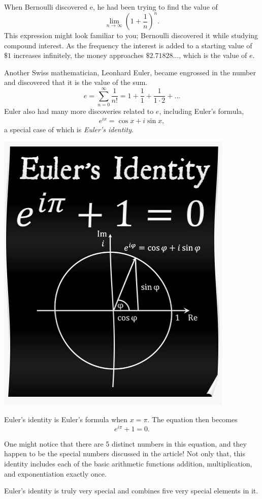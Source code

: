 \documentclass{article}
\begin{document}
When Bernoulli discovered e, he had been trying to find the value of
\[\lim_{n\rightarrow\infty} \left(1+\frac{1}{n}\right)^n.\]
This expression might look familiar to you; Bernoulli discovered it while studying compound interest. As the frequency the interest is added to a starting value of $\$1$ increases infinitely, the money approaches $\$2.71828…$, which is the value of $e$. 

Another Swiss mathematician, Leonhard Euler, became engrossed in the number and discovered that it is the value of the sum.
\[e=\sum_{n=0}^{\infty}\frac{1}{n!}=1+\frac{1}{1}+\frac{1}{1\cdot 2} + ...\]
Euler also had many more discoveries related to $e$, including Euler’s formula, 
\[e^{ix}=\cos x + i\sin x,\]
a special case of which is \emph{Euler’s identity}.

\begin{center}
\includegraphics[scale=0.75]{images/specialnum1.png}
\end{center}

Euler’s identity is Euler’s formula when $x = \pi$. The equation then becomes
\[e^{i\pi}+1=0.\]

One might notice that there are 5 distinct numbers in this equation, and they happen to be the special numbers discussed in the article! Not only that, this identity includes each of the basic arithmetic functions addition, multiplication, and exponentiation exactly once. 

Euler’s identity is truly very special and combines five very special elements in it.
\end{document}
